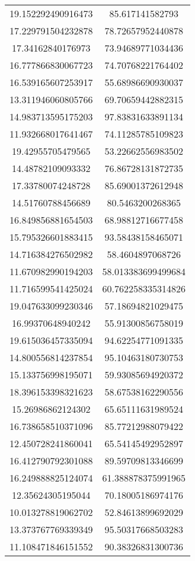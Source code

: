 \begin{table}
\begin{tabular}{cc}
19.152292490916473 & 85.617141582793 \\
17.229791504232878 & 78.72657952440878 \\
17.34162840176973 & 73.94689771034436 \\
16.777866830067723 & 74.70768221764402 \\
16.539165607253917 & 55.68986690930037 \\
13.311946060805766 & 69.70659442882315 \\
14.983713595175203 & 97.83831633891134 \\
11.932668017641467 & 74.11285785109823 \\
19.42955705479565 & 53.22662556983502 \\
14.48782109093332 & 76.86728131872735 \\
17.33780074248728 & 85.69001372612948 \\
14.51760788456689 & 80.5463200268365 \\
16.849856881654503 & 68.98812716677458 \\
15.795326601883415 & 93.58438158465071 \\
14.716384276502982 & 58.4604897068726 \\
11.670982990194203 & 58.013383699499684 \\
11.716599541425024 & 60.762258335314826 \\
19.047633099230346 & 57.18694821029475 \\
16.99370648940242 & 55.91300856758019 \\
19.615036457335094 & 94.62254771091335 \\
14.800556814237854 & 95.10463180730753 \\
15.133756998195071 & 59.93085694920372 \\
18.396153398321623 & 58.67538162290556 \\
15.26986862124302 & 65.65111631989524 \\
16.738658510371096 & 85.77212988079422 \\
12.450728241860041 & 65.54145492952897 \\
16.412790792301088 & 89.59709813346699 \\
16.249888825124074 & 61.388878375991965 \\
12.35624305195044 & 70.18005186974176 \\
10.013278819062702 & 52.84613899692029 \\
13.373767769339349 & 95.50317668503283 \\
11.108471846151552 & 90.38326831300736 \\

\end{tabular}
\end{table}

